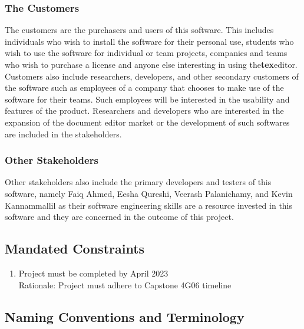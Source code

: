 \documentclass[12pt, titlepage]{article}
\begin{document}
	\subsubsection{The Customers}
	The customers are the purchasers and users of this software. This includes individuals who wish to install the software for their personal use, students who wish to use the software for individual or team projects, companies and teams who wish to purchase a license and anyone else interesting in using the\textbf{tex}editor.\\
	Customers also include researchers, developers, and other secondary customers of the software such as employees of a company that chooses to make use of the software for their teams. Such employees will be interested in the usability and features of the product. Researchers and developers who are interested in the expansion of the document editor market or the development of such softwares are included in the stakeholders.\\
	
	\subsubsection{Other Stakeholders}
	Other stakeholders also include the primary developers and testers of this software, namely Faiq Ahmed, Eesha Qureshi, Veerash Palanichamy, and Kevin Kannammallil as their software engineering skills are a resource invested in this software and they are concerned in the outcome of this project.
	
	\subsection{Mandated Constraints}
	
	\begin{enumerate}[{MC}1.]
		\item Project must be completed by April 2023
		\\Rationale: Project must adhere to Capstone 4G06 timeline
	\end{enumerate}
	
	\subsection{Naming Conventions and Terminology}
	
\end{document}
